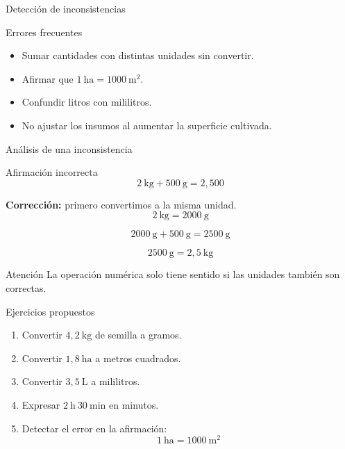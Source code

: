 \documentclass[aspectratio=169,10pt]{beamer}
\newcommand{\alertacaja}[1]{
	\begin{alertblock}{Atención}
		#1
	\end{alertblock}
}
\begin{document}
	\begin{frame}{Detección de inconsistencias}
		\begin{alertblock}{Errores frecuentes}
			\begin{itemize}[<+->]
				\item Sumar cantidades con distintas unidades sin convertir.
				\item Afirmar que \(1\ \text{ha} = 1000\ \text{m}^2\).
				\item Confundir litros con mililitros.
				\item No ajustar los insumos al aumentar la superficie cultivada.
			\end{itemize}
		\end{alertblock}
	\end{frame}
	
	\begin{frame}{Análisis de una inconsistencia}
		\begin{block}{Afirmación incorrecta}
			\[
			2\ \text{kg} + 500\ \text{g} = 2{,}500
			\]
		\end{block}
		
		\pause
		\textbf{Corrección:} primero convertimos a la misma unidad.
		\[
		2\ \text{kg} = 2000\ \text{g}
		\]
		
		\pause
		\[
		2000\ \text{g} + 500\ \text{g} = 2500\ \text{g}
		\]
		
		\pause
		\[
		2500\ \text{g} = 2{,}5\ \text{kg}
		\]
		
		\pause
		\alertacaja{La operación numérica solo tiene sentido si las unidades también son correctas.}
	\end{frame}
	
	\begin{frame}{Ejercicios propuestos}
		\small
		\begin{enumerate}[<+->]
			\item Convertir \(4{,}2\ \text{kg}\) de semilla a gramos.
			\item Convertir \(1{,}8\ \text{ha}\) a metros cuadrados.
			\item Convertir \(3{,}5\ \text{L}\) a mililitros.
			\item Expresar \(2\ \text{h}\ 30\ \text{min}\) en minutos.
			\item Detectar el error en la afirmación:
			\[
			1\ \text{ha} = 1000\ \text{m}^2
			\]
		\end{enumerate}
	\end{frame}
	
\end{document}
